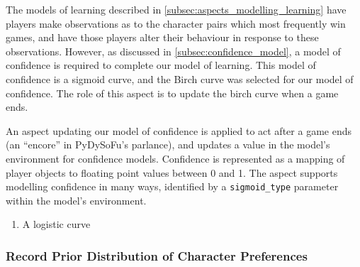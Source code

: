 The models of learning described in \cref{subsec:aspects_modelling_learning} have players
make observations as to the character pairs which most frequently win games, and
have those players alter their behaviour in response to these observations. However,
as discussed in \cref{subsec:confidence_model}, a model of confidence is required to complete
our model of learning. This model of confidence is a sigmoid curve, and the Birch curve was selected
for our model of confidence. The role of this aspect is to update the birch curve when a game ends.

An aspect updating our model of confidence is applied to act after a game ends (an ``encore'' in
PyDySoFu's parlance), and updates a value in the model's environment for confidence models. Confidence
is represented as a mapping of player objects to floating point values between 0 and 1. The aspect supports
modelling confidence in many ways, identified by a \lstinline{sigmoid_type} parameter within the model's environment.

\begin{enumerate}
  \item A logistic curve
\end{enumerate}



\subsubsection{Record Prior Distribution of Character Preferences}


